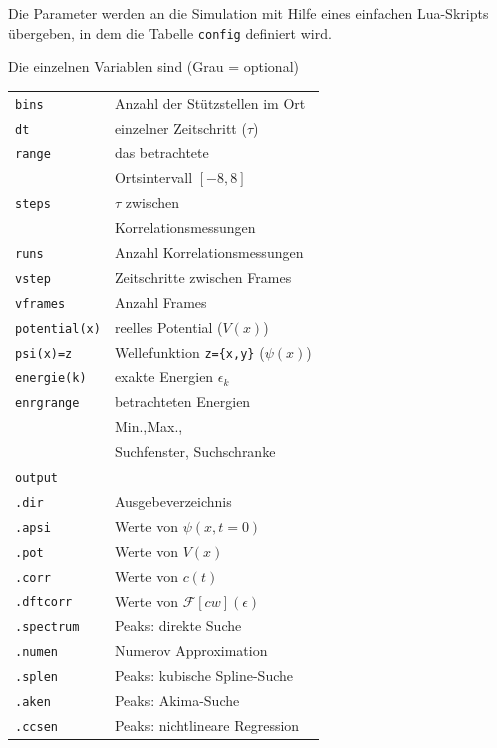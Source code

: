 \documentclass[10pt,a4paper,german]{scrartcl}
\begin{document}
  		
			Die Parameter werden an die Simulation mit Hilfe eines einfachen
			Lua-Skripts übergeben, in dem die Tabelle 
			\lstinline!config! definiert wird.
			
			Die einzelnen Variablen sind (Grau = optional)
			
			\begin{tabular}{ll}
				\lstinline!bins! & Anzahl der Stützstellen im Ort\\
				\lstinline!dt!   & einzelner Zeitschritt ($\tau$)\\
				\lstinline!range!& das betrachtete \\
				                 & Ortsintervall $[-8,8]$\\
				\lstinline!steps!& $\tau$ zwischen \\
				                 & Korrelationsmessungen\\
				\lstinline!runs!& Anzahl Korrelationsmessungen\\
				\rowcolor{lightgray}
				\lstinline!vstep!& Zeitschritte zwischen Frames\\
				\rowcolor{lightgray}
				\lstinline!vframes!& Anzahl Frames\\
				\lstinline!potential(x)!& reelles Potential ($V(x)$)\\
				\lstinline!psi(x)=z!& Wellefunktion \lstinline!z={x,y}! ($\psi(x)$)\\
				\rowcolor{lightgray}
				\lstinline!energie(k)!& exakte Energien $\epsilon_k$\\
				\lstinline!enrgrange!& betrachteten Energien\\
        				 & Min.,Max.,\\
				         & Suchfenster, Suchschranke\\
				\lstinline!output!& \\
				\lstinline!.dir!& Ausgebeverzeichnis\\
				\rowcolor{lightgray}
				\lstinline!.apsi!& Werte von $\psi(x,t=0)$\\
				\rowcolor{lightgray}
				\lstinline!.pot!& Werte von $V(x)$\\
				\rowcolor{lightgray}
				\lstinline!.corr!& Werte von $c(t)$\\
				\rowcolor{lightgray}
				\lstinline!.dftcorr!& Werte von $\mathcal{F}[cw](\epsilon)$ \\
				\rowcolor{lightgray}
				\lstinline!.spectrum!& Peaks: direkte Suche \\
				\rowcolor{lightgray}
				\lstinline!.numen!& Numerov Approximation \\
				\rowcolor{lightgray}
				\lstinline!.splen!& Peaks: kubische Spline-Suche \\
				\rowcolor{lightgray}
				\lstinline!.aken!& Peaks: Akima-Suche \\
				\rowcolor{lightgray}
				\lstinline!.ccsen!& Peaks: nichtlineare Regression \\
			\end{tabular}
			
\end{document}
